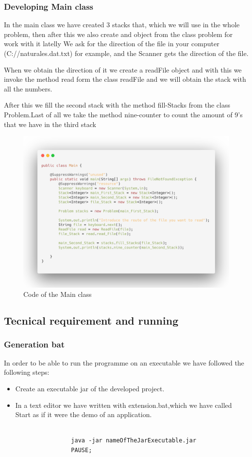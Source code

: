 \documentclass[a4paper]{article}
\theoremstyle{plain}
\theoremstyle{definition}
\begin{document}
        \subsubsection{Developing Main class}
        In the main class we have created 3 stacks that, which we will use in the whole problem, then after this we also create and object from the class problem for work with it latelly We ask for the direction of the file in your computer (C://naturales.dat.txt) for example, and the Scanner gets the direction of the file.\par When we obtain the direction of it we create a readFile object and with this we invoke the method read form the class readFile and we will obtain the stack with all the numbers. \par
    After this we fill the second stack with the method fill-Stacks from the class Problem.Last of all we take the method nine-counter to count the amount of 9's that we have in the third stack
        \begin{figure}[h]
            \centering
            \includegraphics[width=300pt\textwidth]{main-stacks.png}
            \caption{Code of the Main class}
             \label{fig:mesh1}
        \end{figure}
        
        
   \subsection{Tecnical requirement and running}
        \subsubsection{Generation bat}
        In order to be able to run the programme on an executable we have followed the following steps:
        \begin{itemize}
            \item Create an executable jar of the developed project. 
            \item In a text editor we have written with extension.bat,which we have called Start as if it were the demo of an application.
                \begin{verbatim}

                java -jar nameOfTheJarExecutable.jar
                PAUSE;

                \end{verbatim}
        \end{itemize}
\end{document}
